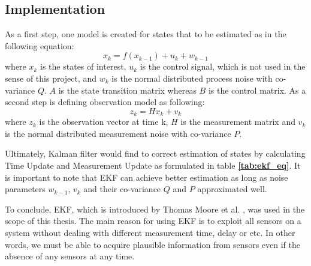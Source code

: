 \subsection*{Implementation}
As a first step, one model is created for states that to be estimated as in the following equation:
\begin{equation}
     x_k = f(x_{k-1})+u_k+w_{k-1}
\end{equation}
where $x_k$ is the states of interest, $u_k$ is the control signal, which is not used in the sense of this project, and $w_k$ is the normal distributed process noise with co-variance $Q$. $A$ is the state transition matrix whereas $B$ is the control matrix. As a second step is defining observation model as following:
\begin{equation}
    z_k = Hx_k+v_k
\end{equation}
where $z_k$ is the observation vector at time k, $H$ is the measurement matrix and $v_k$ is the normal distributed measurement noise with co-variance $P$.
\par Ultimately, Kalman filter would find to correct estimation of states by calculating Time Update and Measurement Update as formulated in table \textbf{\ref{tab:ekf_eq}}. It is important to note that EKF can achieve better estimation as long as noise parameters $w_{k-1}$, $v_k$ and their co-variance $Q$ and $P$ approximated well. 
\par To conclude, EKF, which is introduced by Thomas Moore et al. \cite{kalman4}, was used in the scope of this thesis. The main reason for using EKF is to exploit all sensors on a system without dealing with different measurement time, delay or etc\cite{kalman6}. In other words, we must be able to acquire plausible information from sensors even if the absence of any sensors at any time.
